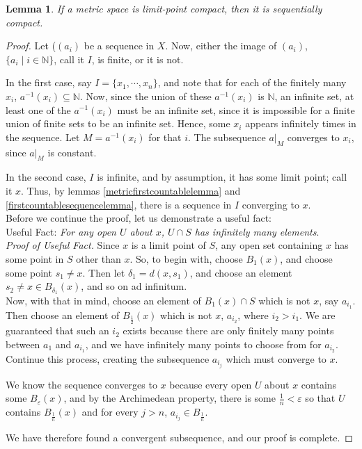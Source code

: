 \documentclass[12pt]{report}
\newcommand{\naturals}{\mathbb{N}}
\newcommand{\eball}{B_\varepsilon}
\newcommand{\ball}[1]{B_{#1}}
\newtheorem{lemma}[theorem]{Lemma}
\begin{document}
\begin{lemma}
\label{metriclcimpliessclemma}
If a metric space is limit-point compact, then it is sequentially compact.
\end{lemma}

\begin{proof}
Let ($(a_i)$ be a sequence in $X$. Now, either the image of $(a_i)$, $\{a_i
\mid i \in \naturals\}$, call it $I$, is finite, or it is not.

In the first case, say $I =  \{x_1, \cdots,
x_n\}$, and note that for each of the finitely many $x_i$,  $a^{-1}(x_i)
\subseteq \naturals$.  Now, since the union of these $a^{-1}(x_i)$ is
$\naturals$, an infinite set, at least one of the $a^{-1}(x_i)$ must be an
infinite set, since it is impossible for a finite union of finite sets to be
an infinite set. Hence, some $x_i$ appears infinitely times in the sequence.
Let $M = a^{-1}(x_i)$ for that $i$.  The subsequence $a|_M$ converges
to $x_i$, since $a|_M$ is constant. 

In the second case, $I$ is infinite, and by assumption, it has some limit
point; call it $x$. Thus, by lemmas \ref{metricfirstcountablelemma} and
\ref{firstcountablesequencelemma}, there is a sequence in $I$ converging 
to $x$. \\

Before we continue the proof, let us demonstrate a useful fact: \\

\noindent
{\sc Useful Fact:} {\em For any open $U$ about $x$, $U \cap S$ has 
infinitely many elements}. \\

\noindent
{\em Proof of {\sc Useful Fact}.} Since $x$ is a limit point of $S$, any 
open set containing $x$ has some
point in $S$ other than $x$. So, to begin with, choose $\ball{1}(x)$, and
choose some point $s_1 \neq x$. Then let $\delta_1 = d(x,s_1)$, and choose an
element $s_2 \neq x \in \ball{\delta_1}(x)$, and so on ad infinitum. \\

Now, with that in mind, choose an element of $\ball{1}(x) \cap S$ which is not
$x$, say $a_{i_1}$.  Then choose an element of $\ball{\frac{1}{2}}(x)$ which
is not $x$, $a_{i_2}$, where $i_2 > i_1$. We are guaranteed that such an $i_2$
exists because there are only finitely many points between $a_1$ and
$a_{i_1}$, and we have infinitely many points to choose from for $a_{i_2}$.
Continue this process, creating the subsequence $a_{i_j}$ which must converge
to $x$.

We know the sequence converges to $x$ because every open $U$ about $x$
contains some $\eball(x)$, and by the Archimedean property,  there is some 
$\frac{1}{n} < \varepsilon$ so that $U$ contains $ \ball{\frac{1}{n}}(x)$
and for every $j > n$, $a_{i_j} \in \ball{\frac{1}{n}}$. 

We have therefore found a convergent subsequence, and our proof is complete.
\end{proof}
\end{document}
